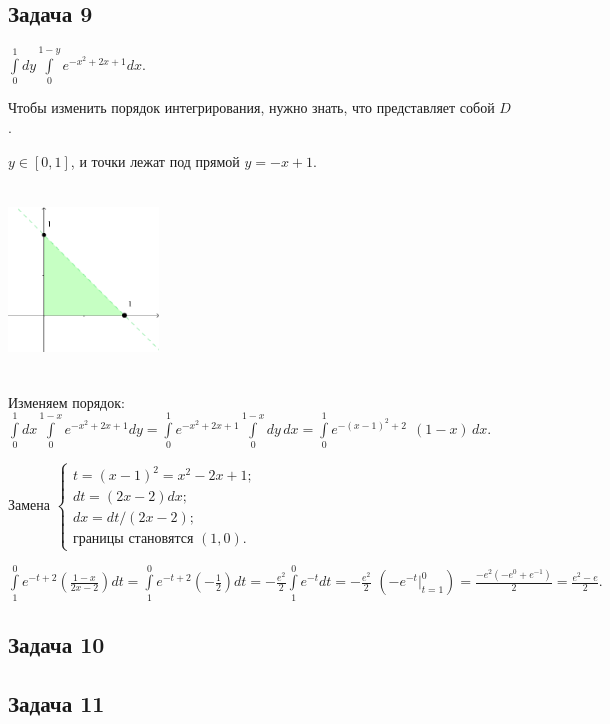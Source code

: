 \documentclass[a4paper, fleqn]{article}
\begin{document}
    \subsection*{Задача 9}
    
    $\int\limits_{0}^{1} dy \int\limits_{0}^{1 - y} e^{-x^2 + 2x + 1} dx.$
    
    Чтобы изменить порядок интегрирования, нужно знать, что представляет собой $D$.
    
    $y \in [0,1]$, и точки лежат под прямой $y = -x + 1$.
    
    \includegraphics[width=4cm, height=5cm]{task 9.png}
    
    Изменяем порядок: $\int\limits_{0}^{1} dx \int\limits_{0}^{1 - x} e^{-x^2 + 2x + 1} dy = 
    \int\limits_{0}^{1} e^{-x^2 + 2x + 1}  \int\limits_{0}^{1 - x} dy \, dx =
    \int\limits_{0}^{1} e^{-(x - 1)^2 + 2} \; \, (1 - x) \, dx.$  
    
    Замена $\begin{cases}
    t = (x - 1)^2 = x^2 - 2x + 1;\\
    dt = (2x - 2)dx;\\
    dx = dt/(2x - 2);\\
    \text{границы становятся } (1, 0).
    \end{cases}$
    
    $\int\limits_{1}^{0} e^{-t + 2} \left( \frac{1 - x}{2x - 2}\right) dt = \int\limits_{1}^{0} e^{-t + 2} \left( - \frac{1}{2}\right) dt = -\frac{e^2}{2} \int\limits_{1}^{0} e^{-t} dt = -\frac{e^2}{2} \, \, \left(-e^{-t} \Bigg|_{t = 1}^{0} \right)=  \frac{-e^2(-e^0 + e^{-1})}{2} = \frac{e^2 - e}{2}.$
    
    \subsection*{Задача 10}
    
    \subsection*{Задача 11}
    
\end{document}
